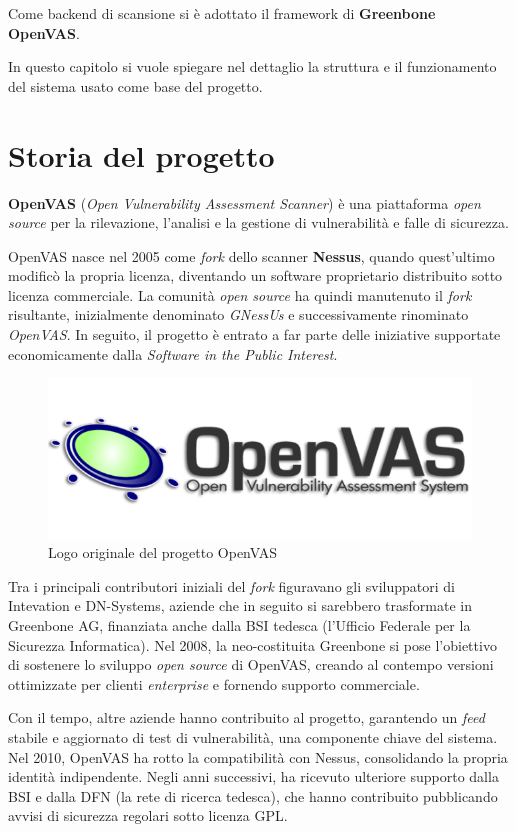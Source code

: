 Come backend di scansione si è adottato il framework di \textbf{Greenbone OpenVAS}.

In questo capitolo si vuole spiegare nel dettaglio la struttura e il funzionamento del sistema usato come base del progetto.

\section{Storia del progetto}
\textbf{OpenVAS} (\emph{Open Vulnerability Assessment Scanner}) è una piattaforma \emph{open source} per la rilevazione, l'analisi e la gestione di vulnerabilità e falle di sicurezza.

OpenVAS nasce nel 2005 come \emph{fork} dello scanner \textbf{Nessus}, quando quest'ultimo modificò la propria licenza, diventando un software proprietario distribuito sotto licenza commerciale. La comunità \emph{open source} ha quindi manutenuto il \emph{fork} risultante, inizialmente denominato \emph{GNessUs} e successivamente rinominato \emph{OpenVAS}. In seguito, il progetto è entrato a far parte delle iniziative supportate economicamente dalla \emph{Software in the Public Interest}.

\begin{figure}[h]
    \centering
    \includegraphics{img/openvas_logo.png}
    \caption{Logo originale del progetto OpenVAS}
\end{figure}

Tra i principali contributori iniziali del \emph{fork} figuravano gli sviluppatori di Intevation e DN-Systems, aziende che in seguito si sarebbero trasformate in Greenbone AG, finanziata anche dalla BSI tedesca (l'Ufficio Federale per la Sicurezza Informatica). Nel 2008, la neo-costituita Greenbone si pose l'obiettivo di sostenere lo sviluppo \emph{open source} di OpenVAS, creando al contempo versioni ottimizzate per clienti \emph{enterprise} e fornendo supporto commerciale.

Con il tempo, altre aziende hanno contribuito al progetto, garantendo un \emph{feed} stabile e aggiornato di test di vulnerabilità, una componente chiave del sistema. Nel 2010, OpenVAS ha rotto la compatibilità con Nessus, consolidando la propria identità indipendente. Negli anni successivi, ha ricevuto ulteriore supporto dalla BSI e dalla DFN (la rete di ricerca tedesca), che hanno contribuito pubblicando avvisi di sicurezza regolari sotto licenza GPL.

